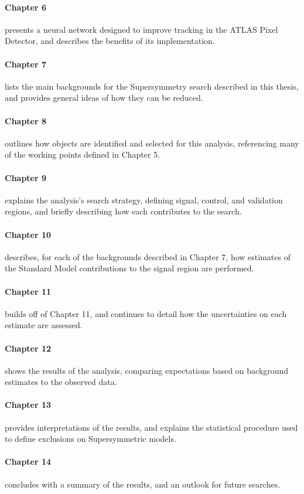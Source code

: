 \paragraph{Chapter 6} presents a neural network designed to improve tracking in the ATLAS Pixel Detector, and describes the benefits of its implementation. 

\paragraph{Chapter 7} lists the main backgrounds for the Supersymmetry search described in this thesis, and provides general ideas of how they can be reduced. 

\paragraph{Chapter 8} outlines how objects are identified and selected for this analysis, referencing many of the working points defined in Chapter 5.  

\paragraph{Chapter 9} explains the analysis's search strategy, defining signal, control, and validation regions, and briefly describing how each contributes to the search.

\paragraph{Chapter 10} describes, for each of the backgrounds described in Chapter 7, how estimates of the Standard Model contributions to the signal region are performed. 

\paragraph{Chapter 11} builds off of Chapter 11, and continues to detail how the uncertainties on each estimate are assessed. 

\paragraph{Chapter 12} shows the results of the analysis, comparing expectations based on background estimates to the observed data. 

\paragraph{Chapter 13} provides interpretations of the results, and explains the statistical procedure used to define exclusions on Supersymmetric models. 

\paragraph{Chapter 14} concludes with a summary of the results, and an outlook for future searches. 
